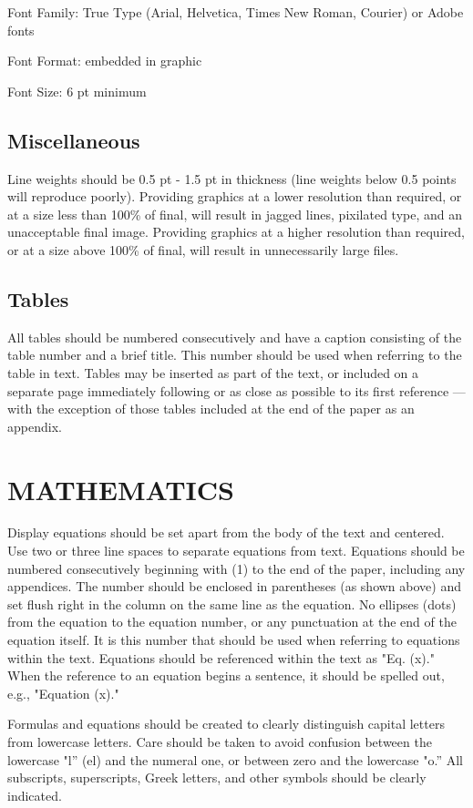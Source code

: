 \documentclass{ISCGRS}
\begin{document}
Font Family: True Type (Arial, Helvetica, Times New Roman, Courier) or Adobe fonts

Font Format: embedded in graphic

Font Size: 6 pt minimum

\subsection{Miscellaneous}
Line weights should be 0.5 pt - 1.5 pt in thickness (line weights below 0.5 points will reproduce poorly). Providing graphics at a lower resolution than required, or at a size less than 100\% of final, will result in jagged lines, pixilated type, and an unacceptable final image. Providing graphics at a higher resolution than required, or at a size above 100\% of final, will result in unnecessarily large files.

\subsection{Tables}
All tables should be numbered consecutively and have a caption consisting of the table number and a brief title. This number should be used when referring to the table in text. Tables may be inserted as part of the text, or included on a separate page immediately following or as close as possible to its first reference — with the exception of those tables included at the end of the paper as an appendix.

\section{MATHEMATICS}
Display equations should be set apart from the body of the text and centered. Use two or three line spaces to separate equations from text. Equations should be numbered consecutively beginning with (1) to the end of the paper, including any appendices. The number should be enclosed in parentheses (as shown above) and set flush right in the column on the same line as the equation. No ellipses (dots) from the equation to the equation number, or any punctuation at the end of the equation itself. It is this number that should be used when referring to equations within the text. Equations should be referenced within the text as "Eq. (x)." When the reference to an equation begins a sentence, it should be spelled out, e.g., "Equation (x)."

Formulas and equations should be created to clearly distinguish capital letters from lowercase letters. Care should be taken to avoid confusion between the lowercase "l'' (el) and the numeral one, or between zero and the lowercase "o.'' All subscripts, superscripts, Greek letters, and other symbols should be clearly indicated.
\end{document}
